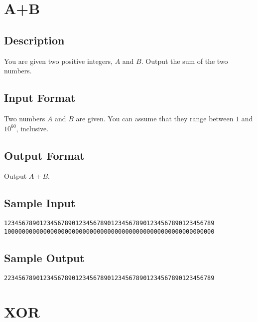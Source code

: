 

\begin{center}\end{center}
\vspace{5mm}


\section{A+B}

\subsection*{Description}
You are given two positive integers, $A$ and $B$. Output the sum of the two numbers.

\subsection*{Input Format}
Two numbers $A$ and $B$ are given. You can assume that they range between $1$ and $10^{60}$, inclusive. 

\subsection*{Output Format}
Output $A+B$.

\subsection*{Sample Input}
\begin{verbatim}
12345678901234567890123456789012345678901234567890123456789
10000000000000000000000000000000000000000000000000000000000
\end{verbatim}

\subsection*{Sample Output}
\begin{verbatim}
22345678901234567890123456789012345678901234567890123456789
\end{verbatim}



\newpage

\section{XOR}

